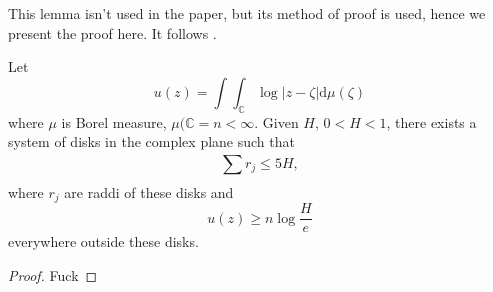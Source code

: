 \begin{appendices}
This lemma isn't used in the paper, but its method of proof is used, hence we present the proof here. It follows \cite[76-78]{levin1996lectures}.
\begin{theorem}
  Let 
  \[
    u(z)=\int\int_{\mathbb{C}}\log \left| z-\zeta \right| \mathrm{d}\mu(\zeta)
  \] 
  where $\mu$ is Borel measure, $\mu(\mathbb{C}=n<\infty$. Given $H$, $0<H<1$, there exists a system of disks in the complex plane such that 
  \[
  \sum_{}^{} r_j\le 5H,
  \] 
  where $r_j$ are raddi of these disks and 
  \[
    u(z)\ge n \log \frac{H}{e}
  \] everywhere outside these disks.
\end{theorem}
\begin{proof}
  Fuck
\end{proof}
\fi
\end{appendices}


